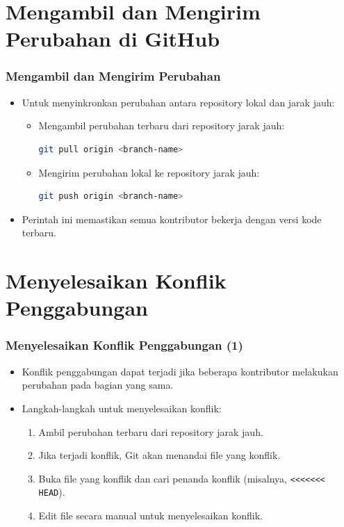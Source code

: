 \documentclass[aspectratio=169, table]{beamer}
\begin{document}
	\section{Mengambil dan Mengirim Perubahan di GitHub}
	
	\begin{frame}[fragile]
		\frametitle{Mengambil dan Mengirim Perubahan}
		\begin{itemize}
			\item Untuk menyinkronkan perubahan antara repository lokal dan jarak jauh:
			\begin{itemize}
				\item Mengambil perubahan terbaru dari repository jarak jauh:
				\begin{lstlisting}[language=bash]
					git pull origin <branch-name>
				\end{lstlisting}
				\item Mengirim perubahan lokal ke repository jarak jauh:
				\begin{lstlisting}[language=bash]
					git push origin <branch-name>
				\end{lstlisting}
			\end{itemize}
			\item Perintah ini memastikan semua kontributor bekerja dengan versi kode terbaru.
		\end{itemize}
	\end{frame}
	
	\section{Menyelesaikan Konflik Penggabungan}
	
	\begin{frame}[fragile]
		\frametitle{Menyelesaikan Konflik Penggabungan (1)}
		\vspace{20pt}
		\begin{itemize}
			\item Konflik penggabungan dapat terjadi jika beberapa kontributor melakukan perubahan pada bagian yang sama.
			\item Langkah-langkah untuk menyelesaikan konflik:
			\begin{enumerate}
				\item Ambil perubahan terbaru dari repository jarak jauh.
				\item Jika terjadi konflik, Git akan menandai file yang konflik.
				\item Buka file yang konflik dan cari penanda konflik (misalnya, \texttt{<<<<<<< HEAD}).
				\item Edit file secara manual untuk menyelesaikan konflik.
			\end{enumerate}
		\end{itemize}
	\end{frame}
	
\end{document}
